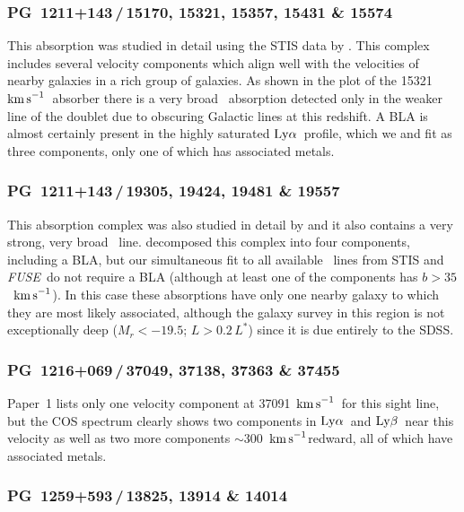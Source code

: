 \documentclass[twocolumn,twocolappendix,tighten,times]{aastex6}
\newcommand{\HI}{\ion{H}{1}}
\newcommand{\OVI}{\ion{O}{6}}
\newcommand{\fuse}{{\sl FUSE}}
\newcommand{\kms}{\ensuremath{{\rm km\,s}^{-1}}}
\newcommand{\lya}{\ensuremath{{\rm Ly}\alpha}}
\newcommand{\lyb}{\ensuremath{{\rm Ly}\beta}}
\begin{document}
\subsubsection{PG~1211+143\,/\,15170, 15321, 15357, 15431 \& 15574}
\label{indiv:absorbers:pg1211_15321}

This absorption was studied in detail using the STIS data by
\citet{tumlinson05}. This complex includes several velocity components
which align well with the velocities of nearby galaxies in a rich
group of galaxies. As shown in the plot of the 15321~\kms\ absorber
there is a very broad \OVI\ absorption detected only in the weaker
line of the doublet due to obscuring Galactic lines at
this redshift. A BLA is almost certainly present in the highly
saturated \lya\ profile, which we and \citet{tumlinson05} fit as three
components, only one of which has associated metals. 


\subsubsection{PG~1211+143\,/\,19305, 19424, 19481 \& 19557}
\label{indiv:absorbers:pg1211_19305}

This absorption complex was also studied in detail by
\citet{tumlinson05} and it also contains a very strong, very broad
\OVI\ line. \citet{tumlinson05} decomposed this complex into four
components, including a BLA, but our 
simultaneous fit to all available \HI\ lines from STIS and \fuse\ do
not require a BLA (although at least one of the components has 
$b>35$~\kms). In this case these
absorptions have only one nearby galaxy to which they are most likely
associated, although the galaxy survey in this region is not
exceptionally deep ($M_r < -19.5$; $L > 0.2\,L^*$) 
since it is due entirely to the SDSS. 


\subsubsection{PG~1216+069\,/\,37049, 37138, 37363 \& 37455}
\label{indiv:absorbers:pg1216_37049}

Paper~1 lists only one velocity component at 37091~\kms\ for this
sight line,  but the COS spectrum clearly shows two components in
\lya\ and \lyb\ near  this velocity as well as two more components
$\sim300$~\kms redward, all of which  have associated metals.


\subsubsection{PG~1259+593\,/\,13825, 13914 \& 14014}
\label{indiv:absorbers:pg1259_13825}
\end{document}
